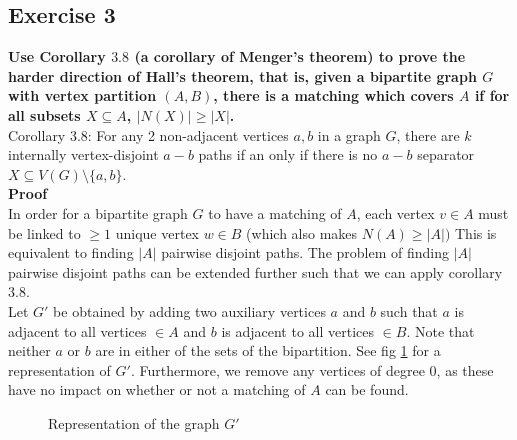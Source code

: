 \subsection*{Exercise 3}
\textbf{Use Corollary $3.8$ (a corollary of Menger’s theorem) to prove the harder direction of Hall’s theorem, that is, given a bipartite graph $G$ with vertex partition $(A,B)$, there is a matching which covers $A$ if for all subsets $X \subseteq A$, $|N(X)| \geq |X|$.\\\linebreak} 
\unboldmath
Corollary 3.8: For any 2 non-adjacent vertices $a,b$ in a graph $G$, there are $k$ internally vertex-disjoint $a-b$ paths if an only if there is no $a-b$ separator $X \subseteq V(G)\setminus \{a, b\}$. \\
\linebreak 
\textbf{Proof} \\
In order for a bipartite graph $G$ to have a matching of $A$, each vertex $v \in A$ must be linked to $\geq 1$ unique vertex $w \in B$ (which also makes $N(A) \geq |A|)$ This is equivalent to finding $|A|$ pairwise disjoint paths. The problem of finding $|A|$ pairwise disjoint paths can be extended further such that we can apply corollary 3.8. \\
\linebreak 
Let $G'$ be obtained by adding two auxiliary vertices $a$ and $b$ such that $a$ is adjacent to all vertices $\in A$ and $b$ is adjacent to all vertices $\in B$. Note that neither $a$ or $b$ are in either of the sets of the bipartition. See fig \ref{fig:bip} for a representation of $G'$. Furthermore, we remove any vertices of degree 0, as these have no impact on whether or not a matching of $A$ can be found. \\
    \begin{figure}[h]
        \centering
        \caption{Representation of the graph $G'$}
        \label{fig:bip}
    \end{figure}
